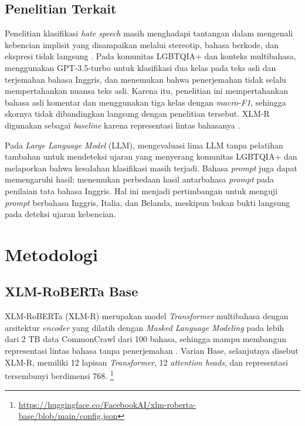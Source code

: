 \documentclass[11pt]{article}
\begin{document}
\subsection{Penelitian Terkait}
\label{subsec:related}

Penelitian klasifikasi \textit{hate speech} masih menghadapi tantangan dalam mengenali kebencian implisit yang disampaikan melalui stereotip, bahasa berkode, dan ekspresi tidak langsung \citep{elsherief-etal-2021-latent}. Pada komunitas LGBTQIA+ dan konteks multibahasa, \citet{chan-etal-2024-hate} menggunakan GPT-3.5-turbo untuk klasifikasi dua kelas pada teks asli dan terjemahan bahasa Inggris, dan menemukan bahwa penerjemahan tidak selalu mempertahankan nuansa teks asli. Karena itu, penelitian ini mempertahankan bahasa asli komentar dan menggunakan tiga kelas dengan \textit{macro-F1}, sehingga skornya tidak dibandingkan langsung dengan penelitian tersebut. XLM-R digunakan sebagai \textit{baseline} karena representasi lintas bahasanya \citep{conneau-etal-2020-unsupervised}.

Pada \textit{Large Language Model} (LLM), \citet{nguyen-etal-2025-leveraging} mengevaluasi lima LLM tanpa pelatihan tambahan untuk mendeteksi ujaran yang menyerang komunitas LGBTQIA+ dan melaporkan bahwa kesalahan klasifikasi masih terjadi. Bahasa \textit{prompt} juga dapat memengaruhi hasil: \citet{behzad-etal-2024-ask} menemukan perbedaan hasil antarbahasa \textit{prompt} pada penilaian tata bahasa Inggris. Hal ini menjadi pertimbangan untuk menguji \textit{prompt} berbahasa Inggris, Italia, dan Belanda, meskipun bukan bukti langsung pada deteksi ujaran kebencian.

\section{Metodologi}
\subsection{XLM-RoBERTa Base}
XLM-RoBERTa (XLM-R) merupakan model \textit{Transformer} multibahasa dengan arsitektur \textit{encoder} yang dilatih dengan \textit{Masked Language Modeling} pada lebih dari 2 TB data CommonCrawl dari 100 bahasa, sehingga mampu membangun representasi lintas bahasa tanpa penerjemahan \citep{conneau-etal-2020-unsupervised}. Varian Base, selanjutnya disebut XLM-R, memiliki 12 lapisan \textit{Transformer}, 12 \textit{attention heads}, dan representasi tersembunyi berdimensi 768.
\footnote{\url{https://huggingface.co/FacebookAI/xlm-roberta-base/blob/main/config.json}}
\end{document}
